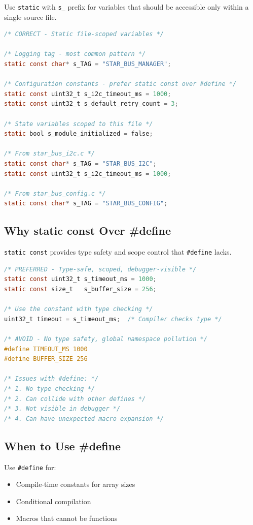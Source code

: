 Use \texttt{static} with \texttt{s\_} prefix for variables that should be accessible only within a single source file.

\begin{lstlisting}[language=C]
/* CORRECT - Static file-scoped variables */

/* Logging tag - most common pattern */
static const char* s_TAG = "STAR_BUS_MANAGER";

/* Configuration constants - prefer static const over #define */
static const uint32_t s_i2c_timeout_ms = 1000;
static const uint32_t s_default_retry_count = 3;

/* State variables scoped to this file */
static bool s_module_initialized = false;

/* From star_bus_i2c.c */
static const char* s_TAG = "STAR_BUS_I2C";
static const uint32_t s_i2c_timeout_ms = 1000;

/* From star_bus_config.c */
static const char* s_TAG = "STAR_BUS_CONFIG";
\end{lstlisting}

\subsection{Why static const Over \#define}

\texttt{static const} provides type safety and scope control that \texttt{\#define} lacks.

\begin{lstlisting}[language=C]
/* PREFERRED - Type-safe, scoped, debugger-visible */
static const uint32_t s_timeout_ms = 1000;
static const size_t   s_buffer_size = 256;

/* Use the constant with type checking */
uint32_t timeout = s_timeout_ms;  /* Compiler checks type */

/* AVOID - No type safety, global namespace pollution */
#define TIMEOUT_MS 1000
#define BUFFER_SIZE 256

/* Issues with #define: */
/* 1. No type checking */
/* 2. Can collide with other defines */
/* 3. Not visible in debugger */
/* 4. Can have unexpected macro expansion */
\end{lstlisting}

\subsection{When to Use \#define}

Use \texttt{\#define} for:
\begin{itemize}
    \item Compile-time constants for array sizes
    \item Conditional compilation
    \item Macros that cannot be functions
\end{itemize}

